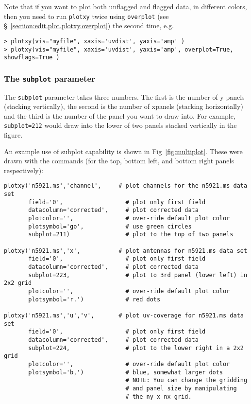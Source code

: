 Note that if you want to plot both unflagged and flagged data, in
different colors, then you need to run {\tt plotxy} twice using
{\tt overplot} (see \S~\ref{section:edit.plot.plotxy.overplot}) 
the second time, e.g.
\small
\begin{verbatim}
> plotxy(vis="myfile", xaxis='uvdist', yaxis='amp' )
> plotxy(vis="myfile", xaxis='uvdist', yaxis='amp', overplot=True, showflags=True )
\end{verbatim}
\normalsize

\subsubsection{ The {\tt subplot} parameter }
\label{section:edit.plot.plotxy.subplot}

The {\tt subplot} parameter takes three
numbers. The first is the number of y panels (stacking vertically),
the second is the number of xpanels (stacking horizontally) and the
third is the number of the panel you want to draw into. For example,
{\tt subplot=212} would draw into the lower of two
panels stacked vertically in the figure.

An example use of subplot capability is shown in
Fig~\ref{fig:multiplot}.  These were drawn with the commands (for the
top, bottom left, and bottom right panels respectively):
\small
\begin{verbatim}
plotxy('n5921.ms','channel',     # plot channels for the n5921.ms data set
       field='0',                  # plot only first field
       datacolumn='corrected',     # plot corrected data
       plotcolor='',               # over-ride default plot color
       plotsymbol='go',            # use green circles
       subplot=211)                # plot to the top of two panels

plotxy('n5921.ms','x',           # plot antennas for n5921.ms data set
       field='0',                  # plot only first field
       datacolumn='corrected',     # plot corrected data
       subplot=223,                # plot to 3rd panel (lower left) in 2x2 grid
       plotcolor='',               # over-ride default plot color
       plotsymbol='r.')            # red dots

plotxy('n5921.ms','u','v',       # plot uv-coverage for n5921.ms data set
       field='0',                  # plot only first field
       datacolumn='corrected',     # plot corrected data
       subplot=224,                # plot to the lower right in a 2x2 grid
       plotcolor='',               # over-ride default plot color
       plotsymbol='b,')            # blue, somewhat larger dots
                                   # NOTE: You can change the gridding
                                   # and panel size by manipulating
                                   # the ny x nx grid.

\end{verbatim}
\normalsize

